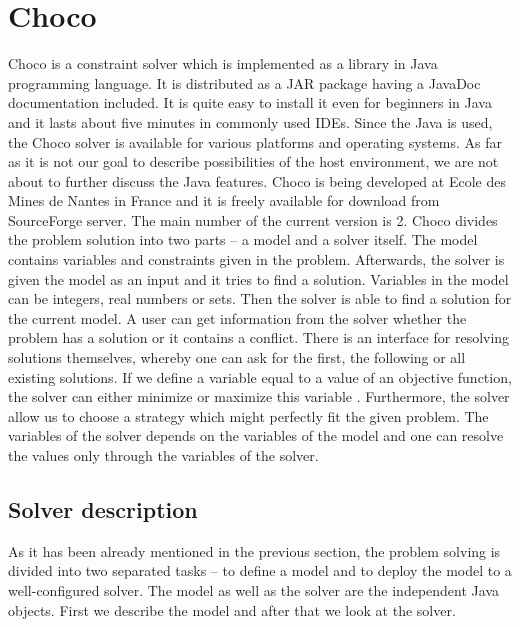 \section{Choco}

Choco is a constraint solver which is implemented as a library in Java programming language.
It is distributed as a JAR package having a JavaDoc documentation included. It is quite easy
to install it even for beginners in Java and it lasts about five minutes in commonly used
IDEs. Since the Java is used, the Choco solver is available for various platforms
and operating systems. As far as it is not our goal to describe possibilities of the host environment, 
we are not about to further discuss the Java features. Choco is being developed
at Ecole des Mines de Nantes in France and it is freely available for download from 
SourceForge server. The main number of the current version is 2. Choco divides the problem solution
into two parts -- a model and a solver itself. The model contains variables and constraints given 
in the problem. Afterwards, the solver is given the model as an input and it tries to find a solution. 
Variables in the model can be integers, real numbers or sets. Then the solver is able to
find a solution for the current model. A user can get information from the solver whether the 
problem has a solution or it contains a conflict. There is an interface for resolving solutions themselves, 
whereby one can ask for the first, the following or all existing solutions. If we define a variable
equal to a value of an objective function, the solver can either minimize or maximize this variable .
Furthermore, the solver allow us to choose a strategy which might perfectly fit the given problem.
The variables of the solver depends on the variables of the model and one can resolve the values only through
the variables of the solver.

\subsection{Solver description}
As it has been already mentioned in the previous section, the problem solving is divided
into two separated tasks -- to define a model and to deploy the model to a well-configured solver.
The model as well as the solver are the independent Java objects. First we describe the 
model and after that we look at the solver. 

